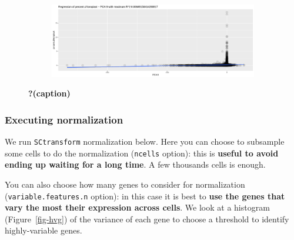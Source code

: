\documentclass[
  letterpaper,
  DIV=11,
  numbers=noendperiod]{scrartcl}
\begin{document}
\begin{figure}
{\begin{figure}[H]
{}

\end{figure}

\begin{figure}[H]

{\centering \includegraphics{notebook_files/figure-pdf/fig-corr-output-4.png}

}

\end{figure}

}

\caption{\label{fig-corr}\textbf{?(caption)}}

\end{figure}

\hypertarget{executing-normalization}{%
\subsubsection{Executing normalization}\label{executing-normalization}}

We run \texttt{SCtransform} normalization below. Here you can choose to
subsample some cells to do the normalization (\texttt{ncells} option):
this is \textbf{useful to avoid ending up waiting for a long time}. A
few thousands cells is enough.

You can also choose how many genes to consider for normalization
(\texttt{variable.features.n} option): in this case it is best to
\textbf{use the genes that vary the most their expression across cells}.
We look at a histogram (Figure~\ref{fig-hvg}) of the variance of each
gene to choose a threshold to identify highly-variable genes.
\end{document}
